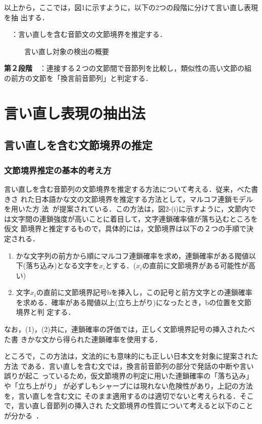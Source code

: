 以上から，ここでは，図1に示すように，以下の2つの段階に分けて言い直し表現を抽
出する．

　：言い直しを含む音節文の文節境界を推定する．
\begin{figure}[bp]
  \bigskip
  \bigskip
  \begin{center}
    \medskip
    \caption{言い直し対象の検出の概要}
    \label{fig:1}
  \end{center}
\end{figure}

\noindent
{\bf 第２段階}　：連接する２つの文節間で音節列を比較し，類似性の高い文節の組
の前方の文節を「換言前音節列」と判定する．
\section{言い直し表現の抽出法}
\subsection{言い直しを含む文節境界の推定}
\subsubsection{文節境界推定の基本的考え方}
言い直しを含む音節列の文節境界を推定する方法について考える．従来，べた書きさ
れた日本語かな文の文節境界を推定する方法として，マルコフ連鎖モデルを用いた方
法~\cite{araki:97:a}が提案されている．この方法は，図2-(i)に示すように，文節内で
は文字間の連鎖強度が高いことに着目して，文字連鎖確率値が落ち込むところを仮文
節境界と推定するもので，具体的には，文節境界は以下の２つの手順で決定される．
\Vspace
\begin{enumerate}
\item かな文字列の前方から順にマルコフ連鎖確率を求め，連鎖確率がある閥値以
下(落ち込み)となる文字を$x_i$とする．($x_i$の直前に文節境界がある可能性が高
い)
\item 文字$x_i$の直前に文節境界記号bを挿入し，この記号と前方文字との連鎖確率
を求める．確率がある閥値以上(立ち上がり)になったとき，bの位置を文節境界と判
定する．
\end{enumerate}
\Vspace

なお，(1)，(2)共に，連鎖確率の評価では，正しく文節境界記号の挿入されたべた書
きかな文から得られた連鎖確率を使用する．

ところで，この方法は，文法的にも意味的にも正しい日本文を対象に提案された方法
である．言い直しを含む文では，換言前音節列の部分で発話の中断や言い誤りが起こ
っているため，仮文節境界の判定に用いた連鎖確率の「落ち込み」や「立ち上がり」
が必ずしもシャープには現れない危険性があり，上記の方法を，言い直しを含む文に
そのまま適用するのは適切でないと考えられる．そこで，言い直し音節列の挿入され
た文節境界の性質について考えると以下のことが分かる~\cite{araki:96:a}．


